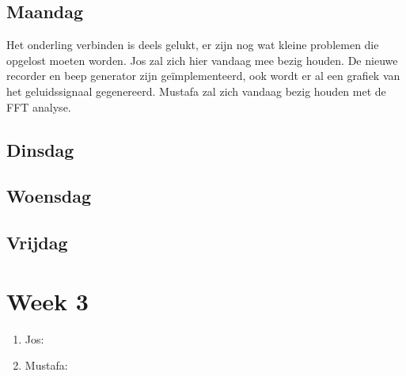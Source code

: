 \documentclass[12pt]{article}
\begin{document}
\subsection*{Maandag}
Het onderling verbinden is deels gelukt, er zijn nog wat kleine problemen die opgelost moeten worden. Jos zal zich hier vandaag mee bezig houden. De nieuwe recorder en beep generator zijn ge\"implementeerd, ook wordt er al een grafiek van het geluidssignaal gegenereerd. Mustafa zal zich vandaag bezig houden met de FFT analyse.
\subsection*{Dinsdag}
\subsection*{Woensdag}
\subsection*{Vrijdag}

\section*{Week 3}
\begin{enumerate}
\item Jos:
\item Mustafa:
\end{enumerate}
\end{document}

